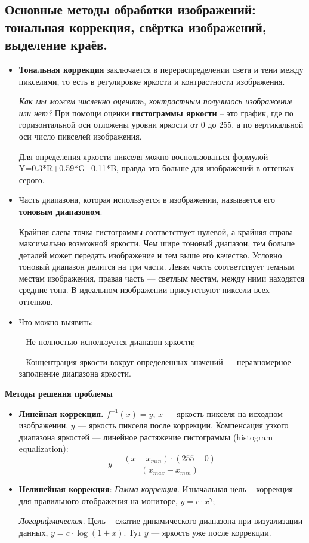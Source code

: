 \subsection{Основные методы обработки изображений: тональная коррекция, свёртка изображений, выделение краёв.}


\begin{itemize}
\item \textbf{Тональная коррекция} заключается в перераспределении света и тени между пикселями, то есть в регулировке яркости и контрастности изображения. 

\textit{ Как мы можем численно оценить, контрастным получилось изображение или нет?} При помощи оценки \textbf{гистограммы яркости} -- это график, где по горизонтальной оси отложены уровни яркости от 0 до 255, а по вертикальной оси число пикселей изображения.

Для определения яркости пикселя можно воспользоваться формулой Y=0.3*R+0.59*G+0.11*B, правда это больше для изображений в оттенках серого.


\item Часть диапазона, которая используется в изображении, называется его \textbf{тоновым диапазоном}. 

Крайняя слева точка гистограммы соответствует нулевой, а крайняя справа -- максимально возможной яркости. Чем шире тоновый диапазон, тем больше деталей может передать изображение и тем выше его качество. Условно тоновый диапазон делится на три части. Левая часть соответствует темным местам изображения, правая часть --- светлым местам, между ними находятся средние тона. В идеальном изображении присутствуют пиксели всех оттенков.
\item Что можно выявить:
    \item[--] Не полностью используется диапазон яркости;
    \item[--] Концентрация яркости вокруг определенных значений --- неравномерное заполнение диапазона яркости.
\end{itemize}



\textbf{Методы решения проблемы}
\begin{itemize}
\item \textbf{Линейная коррекция.} 
$f^{-1}(x) = y$; $x$ --- яркость пикселя на исходном изображении, $y$ --- яркость пикселя после коррекции. Компенсация узкого диапазона яркостей --- линейное растяжение гистограммы (histogram equalization):
$$y = \frac{(x-x_{min})\cdot(255-0)}{(x_{max} - x_{min})}$$

\item \textbf{Нелинейная коррекция}:\newline
\textit{Гамма-коррекция}. Изначальная цель -- коррекция для правильного отображения на мониторе, $y = c \cdot x^\gamma$;

\textit{Логарифмическая}. Цель -- сжатие динамического диапазона при визуализации данных, $y = c \cdot \log(1 + x)$. Тут $y$ --- яркость уже после коррекции.
\end{itemize}

